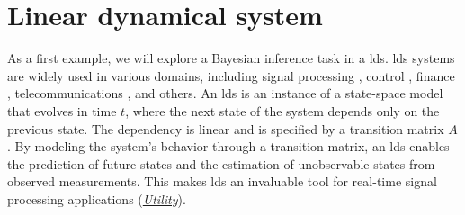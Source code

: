 \section{Linear dynamical system}\label{chapter-05:section:linear-dynamical-system}

As a first example, we will explore a Bayesian inference task in a \ac{lds}. 
\Ac{lds} systems are widely used in various domains, including signal processing
\citep{sarkka_bayesian_2013}, control \citep{pmlr-v134-chen21c}, finance
\citep{Lahmiri_lds_in_finance}, telecommunications \citep{Lawrence_kalman_equalization}, and
others.
An \ac{lds} is an instance of a state-space model that evolves in time $t$, where the next state of
the system depends only on the previous state.
The dependency is linear and is specified by a transition matrix $A$.
By modeling the system's behavior through a transition matrix, an \ac{lds} enables the prediction
of future states and the estimation of unobservable states from observed measurements.
This makes \ac{lds} an invaluable tool for real-time signal processing applications (\hyperlink{experiments:utility}{\emph{Utility}}).


